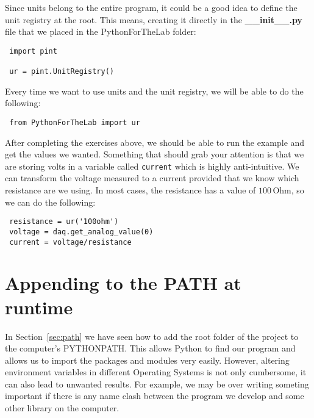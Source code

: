 Since units belong to the entire program, it could be a good idea to define the unit registry at the root. This means, creating it directly in the \textbf{\_\_init\_\_.py} file that we placed in the PythonForTheLab folder:

\begin{verbatim}
 import pint

 ur = pint.UnitRegistry()
\end{verbatim}

Every time we want to use units and the unit registry, we will be able to do the following:

\begin{verbatim}
 from PythonForTheLab import ur
\end{verbatim}



After completing the exercises above, we should be able to run the example and get the values we wanted. Something that should grab your attention is that we are storing volts in a variable called \texttt{current} which is highly anti-intuitive. We can transform the voltage measured to a current provided that we know which resistance are we using. In most cases, the resistance has a value of $100\,\textrm{Ohm}$, so we can do the following:

\begin{verbatim}
 resistance = ur('100ohm')
 voltage = daq.get_analog_value(0)
 current = voltage/resistance
\end{verbatim}

\section{Appending to the PATH at runtime}\label{sec:appending-path}
In Section~\ref{sec:path} we have seen how to add the root folder of the project to the computer's PYTHONPATH. This allows Python to find our program and allows us to import the packages and modules very easily. However, altering environment variables in different Operating Systems is not only cumbersome, it can also lead to unwanted results. For example, we may be over writing someting important if there is any name clash between the program we develop and some other library on the computer.

